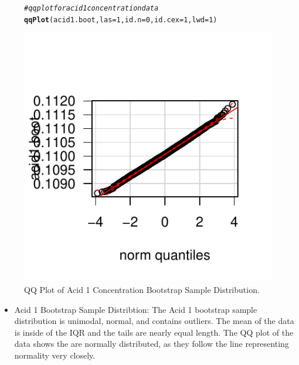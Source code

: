\documentclass{article}\usepackage[]{graphicx}\usepackage[]{color}
\makeatletter
\def\maxwidth{ %
  \ifdim\Gin@nat@width>\linewidth
    \linewidth
  \else
    \Gin@nat@width
  \fi
}
\newcommand{\hlnum}[1]{\textcolor[rgb]{0.686,0.059,0.569}{#1}}%
\newcommand{\hlcom}[1]{\textcolor[rgb]{0.678,0.584,0.686}{\textit{#1}}}%
\newcommand{\hlstd}[1]{\textcolor[rgb]{0.345,0.345,0.345}{#1}}%
\newcommand{\hlkwc}[1]{\textcolor[rgb]{0.333,0.667,0.333}{#1}}%
\newcommand{\hlkwd}[1]{\textcolor[rgb]{0.737,0.353,0.396}{\textbf{#1}}}%
\newenvironment{kframe}{%
 \def\at@end@of@kframe{}%
 \ifinner\ifhmode%
  \def\at@end@of@kframe{\end{minipage}}%
  \begin{minipage}{\columnwidth}%
 \fi\fi%
 \def\FrameCommand##1{\hskip\@totalleftmargin \hskip-\fboxsep
 \colorbox{shadecolor}{##1}\hskip-\fboxsep
     \hskip-\linewidth \hskip-\@totalleftmargin \hskip\columnwidth}%
 \MakeFramed {\advance\hsize-\width
   \@totalleftmargin\z@ \linewidth\hsize
   \@setminipage}}%
 {\par\unskip\endMakeFramed%
 \at@end@of@kframe}
\newenvironment{knitrout}{}{} %
\makeatother
\begin{document}
\begin{figure}[H]  \begin{center}
\begin{knitrout}
\color{fgcolor}\begin{kframe}
\begin{alltt}
\hlcom{# qq plot for acid 1 concentration data}
\hlkwd{qqPlot}\hlstd{(acid1.boot,} \hlkwc{las} \hlstd{=} \hlnum{1}\hlstd{,} \hlkwc{id.n} \hlstd{=} \hlnum{0}\hlstd{,} \hlkwc{id.cex} \hlstd{=} \hlnum{1}\hlstd{,} \hlkwc{lwd} \hlstd{=} \hlnum{1}\hlstd{)}
\end{alltt}
\end{kframe}
\includegraphics[width=\maxwidth]{figure/2_acid1_qqbott} 

\end{knitrout}
\end{center}\caption{QQ Plot of Acid 1 Concentration Bootstrap Sample Distribution.} \end{figure}

\begin{itemize}
\item Acid 1 Bootstrap Sample Distribtion:  The Acid 1 bootstrap sample distribution is unimodal, normal, and contains outliers.  The mean of the data is inside of the IQR and the tails are nearly equal length. The QQ plot of the data shows the are normally distributed, as they follow the line representing normality very closely.
\end{itemize}
\end{document}
